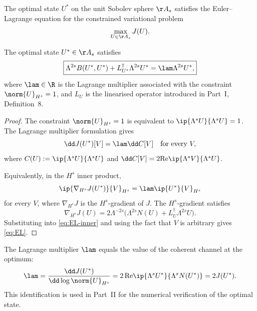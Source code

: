 The optimal state $U^\ast$ on the unit Sobolev sphere $\AA_s$ 
satisfies the Euler--Lagrange equation for the constrained 
variational problem
\begin{equation}\label{eq:constrained-prob}
\max_{U\in\AA_s} J(U).
\end{equation}

\begin{theorem}\label{thm:EL}
The optimal state $U^\ast\in\AA_s$ satisfies
\begin{equation}\label{eq:EL}
\boxed{
\Lambda^{2s} B(U^\ast,U^\ast) + L_{U^\ast}^\dagger \Lambda^{2s} U^\ast = 
\lam\Lambda^{2s}U^\ast,
}
\end{equation}
where $\lam\in\R$ is the Lagrange multiplier associated with the 
constraint $\norm{U}_{H^s}=1$, and $L_U$ is the linearised operator 
introduced in Part~I, Definition~8.
\end{theorem}

\begin{proof}
The constraint $\norm{U}_{H^s}=1$ is equivalent to 
$\ip{\Lambda^s U}{\Lambda^s U}=1$. The Lagrange multiplier 
formulation gives
\begin{equation*}
\dd J(U^\ast)[V] = \lam\dd C[V] \quad\text{for every }V,
\end{equation*}
where $C(U) := \ip{\Lambda^s U}{\Lambda^s U}$ and 
$\dd C[V] = 2\mathrm{Re}\ip{\Lambda^s V}{\Lambda^s U}$.

Equivalently, in the $H^s$ inner product,
\begin{equation}\label{eq:EL-inner}
\ip{\nabla_{H^s}J(U^\ast)}{V}_{H^s} = \lam\ip{U^\ast}{V}_{H^s}
\end{equation}
for every $V$, where $\nabla_{H^s}J$ is the $H^s$-gradient of $J$. 
The $H^s$-gradient satisfies
\begin{equation}\label{eq:Hs-grad}
\nabla_{H^s}J(U) = 2\Lambda^{-2s}\bigl(\Lambda^{2s}N(U) + 
L_U^\dagger \Lambda^{2s}U\bigr).
\end{equation}
Substituting into \eqref{eq:EL-inner} and using the fact that $V$ is 
arbitrary gives \eqref{eq:EL}.
\end{proof}

\begin{remark}\label{rem:multiplier}
The Lagrange multiplier $\lam$ equals the value of the coherent 
channel at the optimum:
\begin{equation}\label{eq:lambda-value}
\lam = \frac{\dd J(U^\ast)}{\dd\log\norm{U}_{H^s}} = 
2\,\mathrm{Re}\ip{\Lambda^s U^\ast}{\Lambda^s N(U^\ast)} = 2J(U^\ast).
\end{equation}
This identification is used in Part~II for the numerical 
verification of the optimal state.
\end{remark}

